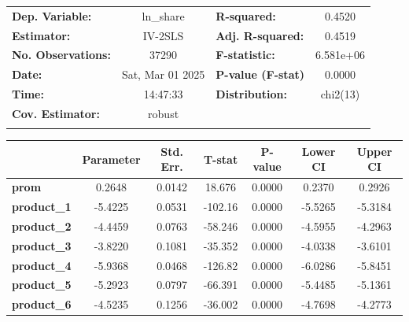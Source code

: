 \documentclass[11pt]{article}
\begin{document}
    \begin{center}
\begin{tabular}{lclc}
\toprule
\textbf{Dep. Variable:}    &     ln\_share      & \textbf{  R-squared:         } &      0.4520      \\
\textbf{Estimator:}        &      IV-2SLS       & \textbf{  Adj. R-squared:    } &      0.4519      \\
\textbf{No. Observations:} &       37290        & \textbf{  F-statistic:       } &    6.581e+06     \\
\textbf{Date:}             &  Sat, Mar 01 2025  & \textbf{  P-value (F-stat)   } &      0.0000      \\
\textbf{Time:}             &      14:47:33      & \textbf{  Distribution:      } &     chi2(13)     \\
\textbf{Cov. Estimator:}   &       robust       & \textbf{                     } &                  \\
\textbf{}                  &                    & \textbf{                     } &                  \\
\bottomrule
\end{tabular}
\begin{tabular}{lcccccc}
                     & \textbf{Parameter} & \textbf{Std. Err.} & \textbf{T-stat} & \textbf{P-value} & \textbf{Lower CI} & \textbf{Upper CI}  \\
\midrule
\textbf{prom}        &       0.2648       &       0.0142       &      18.676     &      0.0000      &       0.2370      &       0.2926       \\
\textbf{product\_1}  &      -5.4225       &       0.0531       &     -102.16     &      0.0000      &      -5.5265      &      -5.3184       \\
\textbf{product\_2}  &      -4.4459       &       0.0763       &     -58.246     &      0.0000      &      -4.5955      &      -4.2963       \\
\textbf{product\_3}  &      -3.8220       &       0.1081       &     -35.352     &      0.0000      &      -4.0338      &      -3.6101       \\
\textbf{product\_4}  &      -5.9368       &       0.0468       &     -126.82     &      0.0000      &      -6.0286      &      -5.8451       \\
\textbf{product\_5}  &      -5.2923       &       0.0797       &     -66.391     &      0.0000      &      -5.4485      &      -5.1361       \\
\textbf{product\_6}  &      -4.5235       &       0.1256       &     -36.002     &      0.0000      &      -4.7698      &      -4.2773       \\

\end{tabular}
\end{center}
\end{document}
